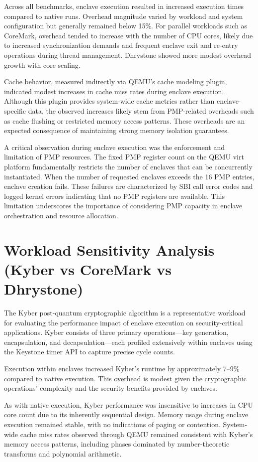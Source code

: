 Across all benchmarks, enclave execution resulted in increased execution times compared to native runs. Overhead magnitude varied by workload and system configuration but generally remained below 15\%. For parallel workloads such as CoreMark, overhead tended to increase with the number of CPU cores, likely due to increased synchronization demands and frequent enclave exit and re-entry operations during thread management. Dhrystone showed more modest overhead growth with core scaling.

Cache behavior, measured indirectly via QEMU’s cache modeling plugin, indicated modest increases in cache miss rates during enclave execution. Although this plugin provides system-wide cache metrics rather than enclave-specific data, the observed increases likely stem from PMP-related overheads such as cache flushing or restricted memory access patterns. These overheads are an expected consequence of maintaining strong memory isolation guarantees.

A critical observation during enclave execution was the enforcement and limitation of PMP resources. The fixed PMP register count on the QEMU virt platform fundamentally restricts the number of enclaves that can be concurrently instantiated. When the number of requested enclaves exceeds the 16 PMP entries, enclave creation fails. These failures are characterized by SBI call error codes and logged kernel errors indicating that no PMP registers are available. This limitation underscores the importance of considering PMP capacity in enclave orchestration and resource allocation.

\section{Workload Sensitivity Analysis (Kyber vs CoreMark vs Dhrystone)}

The Kyber post-quantum cryptographic algorithm is a representative workload for evaluating the performance impact of enclave execution on security-critical applications. Kyber consists of three primary operations—key generation, encapsulation, and decapsulation—each profiled extensively within enclaves using the Keystone timer API to capture precise cycle counts.

Execution within enclaves increased Kyber’s runtime by approximately 7–9\% compared to native execution. This overhead is modest given the cryptographic operations’ complexity and the security benefits provided by enclaves.

As with native execution, Kyber performance was insensitive to increases in CPU core count due to its inherently sequential design. Memory usage during enclave execution remained stable, with no indications of paging or contention. System-wide cache miss rates observed through QEMU remained consistent with Kyber’s memory access patterns, including phases dominated by number-theoretic transforms and polynomial arithmetic.

